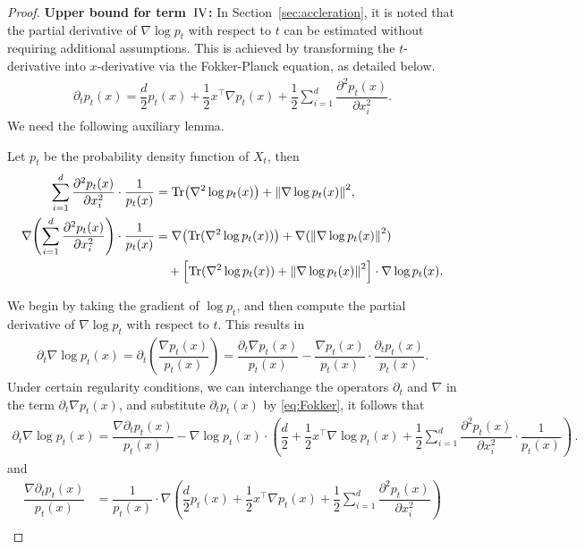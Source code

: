 \begin{proof}
\noindent \textbf{Upper bound for term~$\rm IV$:}
In Section~\ref{sec:accleration}, it is noted that the partial derivative of $\nabla\log p_t$ with respect to $t$ can be estimated without requiring additional assumptions. 
This is achieved by transforming the $t$-derivative into $x$-derivative via the Fokker-Planck equation, as detailed below.
\begin{align}
    \label{eq:Fokker}
    \partial_t p_t(x)=\dfrac{d}{2}p_t(x)+\dfrac{1}{2}x^\top\nabla p_t(x)+\dfrac{1}{2}\sum_{i=1}^d \dfrac{\partial^2p_t(x)}{\partial x_i^2}.
\end{align}
We need the following auxiliary lemma. 
\begin{lemma}
    \label{lem:Fokker}
    Let $p_t$ be the probability density function of $X_t$, then
    \begin{align*}
        \sum_{i=1}^d\dfrac{\partial^2 p_t(x)}{\partial x_i^2}\cdot\dfrac{1}{p_t(x)}&=\Tr\left(\nabla^2\log p_t(x)\right)+\l|\nabla\log p_t(x)\r|^2,\\
        \nabla\left(\sum_{i=1}^d\dfrac{\partial^2p_t(x)}{\partial x_i^2}\right)\cdot\dfrac{1}{p_t(x)}&=\nabla\left(\Tr(\nabla^2\log p_t(x))\right)+\nabla(\l|\nabla\log p_t(x)\r|^2)\\
        &\quad+\left[\Tr(\nabla^2\log p_t(x))+\l|\nabla\log p_t(x)\r|^2\right]\cdot\nabla\log p_t(x).
    \end{align*}
\end{lemma}
We begin by taking the gradient of $\log p_t$, and then compute the partial derivative of $\nabla \log p_t$ with respect to $t$. This results in
\begin{align*}
    \partial_t\nabla\log p_t(x)=\partial_t\left(\dfrac{\nabla p_t(x)}{p_t(x)}\right)=\dfrac{\partial_t\nabla p_t(x)}{p_t(x)}-\dfrac{\nabla p_t(x)}{p_t(x)}\cdot\dfrac{\partial_t p_t(x)}{p_t(x)}.
\end{align*}
Under certain regularity conditions, we can interchange the operators $\partial_t$ and $\nabla$ in the term $\partial_t\nabla p_t(x)$, and substitute $\partial_t p_t(x)$ by \eqref{eq:Fokker}, it follows that
\begin{align*}
    \partial_t\nabla\log p_t(x)=\dfrac{\nabla\partial_t p_t(x)}{p_t(x)}-\nabla\log p_t(x)\cdot\left(\dfrac{d}{2}+\dfrac{1}{2}x^\top\nabla\log p_t(x)+\dfrac{1}{2}\sum_{i=1}^d\dfrac{\partial^2p_t(x)}{\partial x_i^2}\cdot\dfrac{1}{p_t(x)}\right)\,.
\end{align*}
and 
\begin{align*}
    \dfrac{\nabla\partial_tp_t(x)}{p_t(x)}&=\dfrac{1}{p_t(x)}\cdot\nabla\left(\dfrac{d}{2}p_t(x)+\dfrac{1}{2}x^\top\nabla p_t(x)+\dfrac{1}{2}\sum_{i=1}^d \dfrac{\partial^2p_t(x)}{\partial x_i^2}\right)\\

\end{align*}
\end{proof}
